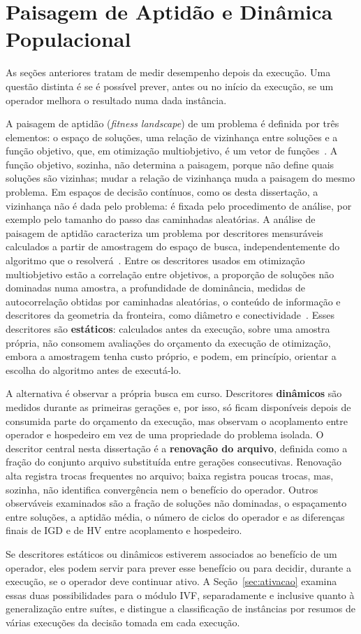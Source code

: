 \section{Paisagem de Aptidão e Dinâmica Populacional}
\label{sec:paisagem}

As seções anteriores tratam de medir desempenho depois da execução. Uma questão distinta é se é possível prever, antes ou no início da execução, se um operador melhora o resultado numa dada instância.

A paisagem de aptidão (\textit{fitness landscape}) de um problema é definida por três elementos: o espaço de soluções, uma relação de vizinhança entre soluções e a função objetivo, que, em otimização multiobjetivo, é um vetor de funções~\cite{liefooghe2018landscape}. A função objetivo, sozinha, não determina a paisagem, porque não define quais soluções são vizinhas; mudar a relação de vizinhança muda a paisagem do mesmo problema. Em espaços de decisão contínuos, como os desta dissertação, a vizinhança não é dada pelo problema: é fixada pelo procedimento de análise, por exemplo pelo tamanho do passo das caminhadas aleatórias. A análise de paisagem de aptidão caracteriza um problema por descritores mensuráveis calculados a partir de amostragem do espaço de busca, independentemente do algoritmo que o resolverá~\cite{mersmann2011exploratory}. Entre os descritores usados em otimização multiobjetivo estão a correlação entre objetivos, a proporção de soluções não dominadas numa amostra, a profundidade de dominância, medidas de autocorrelação obtidas por caminhadas aleatórias, o conteúdo de informação e descritores da geometria da fronteira, como diâmetro e conectividade~\cite{liefooghe2018landscape}. Esses descritores são \textbf{estáticos}: calculados antes da execução, sobre uma amostra própria, não consomem avaliações do orçamento da execução de otimização, embora a amostragem tenha custo próprio, e podem, em princípio, orientar a escolha do algoritmo antes de executá-lo.

A alternativa é observar a própria busca em curso. Descritores \textbf{dinâmicos} são medidos durante as primeiras gerações e, por isso, só ficam disponíveis depois de consumida parte do orçamento da execução, mas observam o acoplamento entre operador e hospedeiro em vez de uma propriedade do problema isolada. O descritor central nesta dissertação é a \textbf{renovação do arquivo}, definida como a fração do conjunto arquivo substituída entre gerações consecutivas. Renovação alta registra trocas frequentes no arquivo; baixa registra poucas trocas, mas, sozinha, não identifica convergência nem o benefício do operador. Outros observáveis examinados são a fração de soluções não dominadas, o espaçamento entre soluções, a aptidão média, o número de ciclos do operador e as diferenças finais de IGD e de HV entre acoplamento e hospedeiro.

Se descritores estáticos ou dinâmicos estiverem associados ao benefício de um operador, eles podem servir para prever esse benefício ou para decidir, durante a execução, se o operador deve continuar ativo. A Seção~\ref{sec:ativacao} examina essas duas possibilidades para o módulo IVF, separadamente e inclusive quanto à generalização entre suítes, e distingue a classificação de instâncias por resumos de várias execuções da decisão tomada em cada execução.
